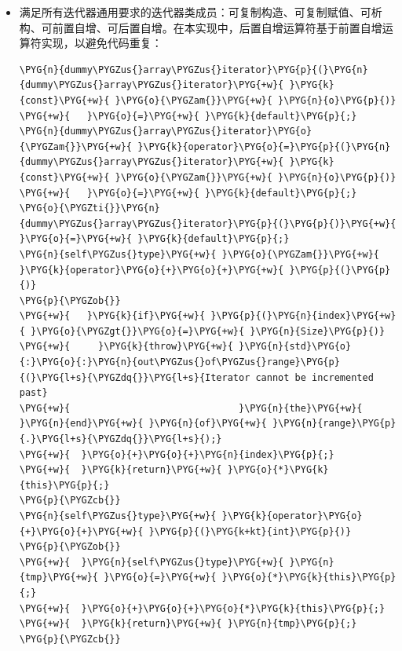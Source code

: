 \begin{itemize}

\item 满足所有迭代器通用要求的迭代器类成员：可复制构造、可复制赋值、可析构、可前置自增、可后置自增。在本实现中，后置自增运算符基于前置自增运算符实现，以避免代码重复：


\begin{codeblockbg}
\begin{Verbatim}[commandchars=\\\{\},breaklines=true,breakanywhere=true,fontsize=\codefont,xleftmargin=17bp]
\PYG{n}{dummy\PYGZus{}array\PYGZus{}iterator}\PYG{p}{(}\PYG{n}{dummy\PYGZus{}array\PYGZus{}iterator}\PYG{+w}{ }\PYG{k}{const}\PYG{+w}{ }\PYG{o}{\PYGZam{}}\PYG{+w}{ }\PYG{n}{o}\PYG{p}{)}
\PYG{+w}{   }\PYG{o}{=}\PYG{+w}{ }\PYG{k}{default}\PYG{p}{;}
\PYG{n}{dummy\PYGZus{}array\PYGZus{}iterator}\PYG{o}{\PYGZam{}}\PYG{+w}{ }\PYG{k}{operator}\PYG{o}{=}\PYG{p}{(}\PYG{n}{dummy\PYGZus{}array\PYGZus{}iterator}\PYG{+w}{ }\PYG{k}{const}\PYG{+w}{ }\PYG{o}{\PYGZam{}}\PYG{+w}{ }\PYG{n}{o}\PYG{p}{)}
\PYG{+w}{   }\PYG{o}{=}\PYG{+w}{ }\PYG{k}{default}\PYG{p}{;}
\PYG{o}{\PYGZti{}}\PYG{n}{dummy\PYGZus{}array\PYGZus{}iterator}\PYG{p}{(}\PYG{p}{)}\PYG{+w}{ }\PYG{o}{=}\PYG{+w}{ }\PYG{k}{default}\PYG{p}{;}
\PYG{n}{self\PYGZus{}type}\PYG{+w}{ }\PYG{o}{\PYGZam{}}\PYG{+w}{ }\PYG{k}{operator}\PYG{o}{+}\PYG{o}{+}\PYG{+w}{ }\PYG{p}{(}\PYG{p}{)}
\PYG{p}{\PYGZob{}}
\PYG{+w}{   }\PYG{k}{if}\PYG{+w}{ }\PYG{p}{(}\PYG{n}{index}\PYG{+w}{ }\PYG{o}{\PYGZgt{}}\PYG{o}{=}\PYG{+w}{ }\PYG{n}{Size}\PYG{p}{)}
\PYG{+w}{     }\PYG{k}{throw}\PYG{+w}{ }\PYG{n}{std}\PYG{o}{:}\PYG{o}{:}\PYG{n}{out\PYGZus{}of\PYGZus{}range}\PYG{p}{(}\PYG{l+s}{\PYGZdq{}}\PYG{l+s}{Iterator cannot be incremented past}
\PYG{+w}{                              }\PYG{n}{the}\PYG{+w}{ }\PYG{n}{end}\PYG{+w}{ }\PYG{n}{of}\PYG{+w}{ }\PYG{n}{range}\PYG{p}{.}\PYG{l+s}{\PYGZdq{}}\PYG{l+s}{);}
\PYG{+w}{  }\PYG{o}{+}\PYG{o}{+}\PYG{n}{index}\PYG{p}{;}
\PYG{+w}{  }\PYG{k}{return}\PYG{+w}{ }\PYG{o}{*}\PYG{k}{this}\PYG{p}{;}
\PYG{p}{\PYGZcb{}}
\PYG{n}{self\PYGZus{}type}\PYG{+w}{ }\PYG{k}{operator}\PYG{o}{+}\PYG{o}{+}\PYG{+w}{ }\PYG{p}{(}\PYG{k+kt}{int}\PYG{p}{)}
\PYG{p}{\PYGZob{}}
\PYG{+w}{  }\PYG{n}{self\PYGZus{}type}\PYG{+w}{ }\PYG{n}{tmp}\PYG{+w}{ }\PYG{o}{=}\PYG{+w}{ }\PYG{o}{*}\PYG{k}{this}\PYG{p}{;}
\PYG{+w}{  }\PYG{o}{+}\PYG{o}{+}\PYG{o}{*}\PYG{k}{this}\PYG{p}{;}
\PYG{+w}{  }\PYG{k}{return}\PYG{+w}{ }\PYG{n}{tmp}\PYG{p}{;}
\PYG{p}{\PYGZcb{}}
\end{Verbatim}
\end{codeblockbg}



\end{itemize}
